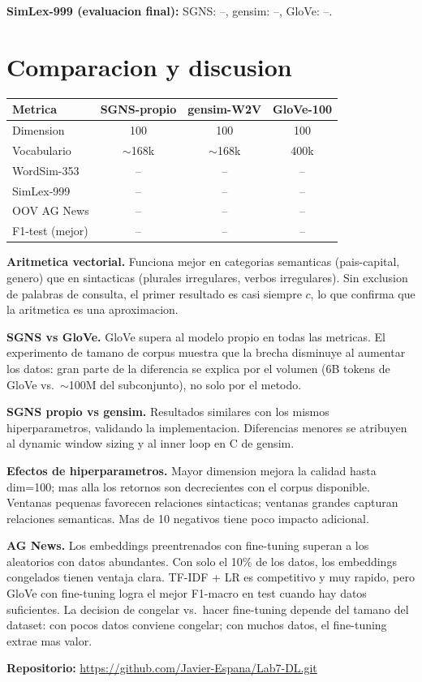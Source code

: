 \documentclass[11pt,a4paper]{article}
\begin{document}
\textbf{SimLex-999 (evaluacion final):} SGNS: --, gensim: --, GloVe: --.

\section{Comparacion y discusion}

\begin{center}
\small
\begin{tabular}{lccc}
\toprule
Metrica & SGNS-propio & gensim-W2V & GloVe-100 \\
\midrule
Dimension         & 100 & 100 & 100 \\
Vocabulario       & $\sim$168k & $\sim$168k & 400k \\
WordSim-353       & -- & -- & -- \\
SimLex-999        & -- & -- & -- \\
OOV AG News       & -- & -- & -- \\
F1-test (mejor)   & -- & -- & -- \\
\bottomrule
\end{tabular}
\end{center}

\textbf{Aritmetica vectorial.} Funciona mejor en categorias semanticas
(pais-capital, genero) que en sintacticas (plurales irregulares, verbos
irregulares). Sin exclusion de palabras de consulta, el primer resultado es
casi siempre $c$, lo que confirma que la aritmetica es una aproximacion.

\textbf{SGNS vs GloVe.} GloVe supera al modelo propio en todas las metricas.
El experimento de tamano de corpus muestra que la brecha disminuye al aumentar
los datos: gran parte de la diferencia se explica por el volumen (6B tokens de
GloVe vs.\ $\sim$100M del subconjunto), no solo por el metodo.

\textbf{SGNS propio vs gensim.} Resultados similares con los mismos hiperparametros,
validando la implementacion. Diferencias menores se atribuyen al dynamic window
sizing y al inner loop en C de gensim.

\textbf{Efectos de hiperparametros.} Mayor dimension mejora la calidad hasta
dim=100; mas alla los retornos son decrecientes con el corpus disponible.
Ventanas pequenas favorecen relaciones sintacticas; ventanas grandes capturan
relaciones semanticas. Mas de 10 negativos tiene poco impacto adicional.

\textbf{AG News.} Los embeddings preentrenados con fine-tuning superan a los
aleatorios con datos abundantes. Con solo el 10\% de los datos, los embeddings
congelados tienen ventaja clara. TF-IDF + LR es competitivo y muy rapido, pero
GloVe con fine-tuning logra el mejor F1-macro en test cuando hay datos suficientes.
La decision de congelar vs.\ hacer fine-tuning depende del tamano del dataset:
con pocos datos conviene congelar; con muchos datos, el fine-tuning extrae mas valor.

\vspace{0.5em}
\noindent\textbf{Repositorio:} \url{https://github.com/Javier-Espana/Lab7-DL.git}
\end{document}
